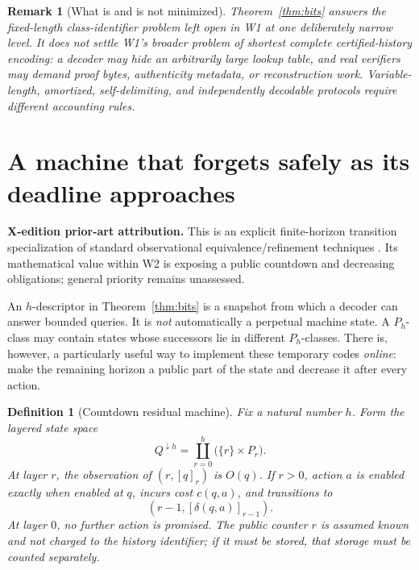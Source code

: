 \documentclass[11pt,letterpaper]{article}
\newcommand{\PriorArtNote}[1]{%
\par\smallskip\noindent\begin{minipage}{\linewidth}\small\color{black!85}%
\textbf{X-edition prior-art attribution.} #1\end{minipage}\par\smallskip}
\newtheorem{definition}[theorem]{Definition}
\newtheorem{remark}[theorem]{Remark}
\begin{document}
\begin{remark}[What is and is not minimized]
Theorem~\ref{thm:bits} answers the \emph{fixed-length class-identifier} problem left open in W1 at one deliberately narrow level. It does not settle W1's broader problem of shortest complete certified-history encoding: a decoder may hide an arbitrarily large lookup table, and real verifiers may demand proof bytes, authenticity metadata, or reconstruction work. Variable-length, amortized, self-delimiting, and independently decodable protocols require different accounting rules.
\end{remark}

\section{A machine that forgets safely as its deadline approaches}
\PriorArtNote{This is an explicit finite-horizon transition specialization of standard observational equivalence/refinement techniques \cite{nerode,milner}. Its mathematical value within W2 is exposing a public countdown and decreasing obligations; general priority remains unassessed.}
An $h$-descriptor in Theorem~\ref{thm:bits} is a snapshot from which a decoder can answer bounded queries. It is \emph{not} automatically a perpetual machine state. A $P_h$-class may contain states whose successors lie in different $P_h$-classes. There is, however, a particularly useful way to implement these temporary codes \emph{online}: make the remaining horizon a public part of the state and decrease it after every action.

\begin{definition}[Countdown residual machine]\label{def:countdown}
Fix a natural number $h$. Form the layered state space
\[
 Q^{\downarrow h}=\coprod_{r=0}^{h}\bigl(\{r\}\times P_r\bigr).
\]
At layer $r$, the observation of $(r,[q]_r)$ is $O(q)$. If $r>0$, action $a$ is enabled exactly when enabled at $q$, incurs cost $c(q,a)$, and transitions to
\begin{equation}\label{eq:layerupdate}
 (r-1,[\delta(q,a)]_{r-1}).
\end{equation}
At layer $0$, no further action is promised. The public counter $r$ is assumed known and not charged to the history identifier; if it must be stored, that storage must be counted separately.
\end{definition}
\end{document}

